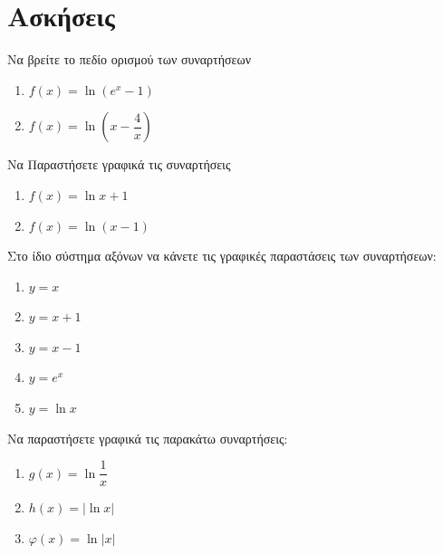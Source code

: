 \documentclass{presentation}
\begin{document}
\section{Ασκήσεις}
\begin{askisi}
  Να βρείτε το πεδίο ορισμού των συναρτήσεων
  \begin{enumerate}
    \item<1-> $f(x)=\ln (e^x-1)$
    \item<2-> $f(x)=\ln \left( x-\dfrac{4}{x} \right) $
  \end{enumerate}


\end{askisi}

\begin{askisi}
  Να Παραστήσετε γραφικά τις συναρτήσεις
  \begin{enumerate}
    \item<1-> $f(x)=\ln x+1$
    \item<2-> $f(x)=\ln (x-1)$
  \end{enumerate}


\end{askisi}

\begin{askisi}
  Στο ίδιο σύστημα αξόνων να κάνετε τις γραφικές παραστάσεις των συναρτήσεων:
  \begin{enumerate}
    \item $y=x$
    \item $y=x+1$
    \item $y=x-1$
    \item $y=e^x$
    \item $y=\ln x$
  \end{enumerate}


\end{askisi}

\begin{askisi}
  Να παραστήσετε γραφικά τις παρακάτω συναρτήσεις:
  \begin{enumerate}
    \item<1-> $g(x)=\ln \dfrac{1}{x}$
    \item<2-> $h(x)=|\ln x|$
    \item<3-> $φ(x)=\ln |x|$
  \end{enumerate}


\end{askisi}
\end{document}

